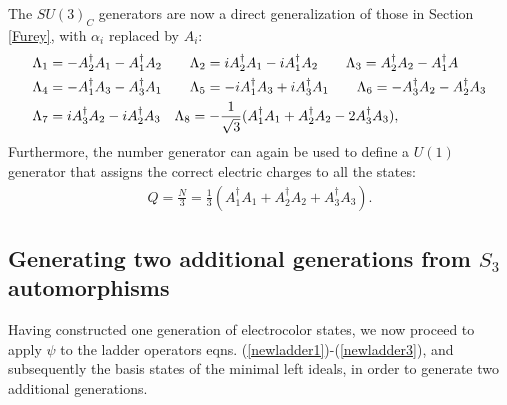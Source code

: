 \documentclass{article}
\newcommand{\bb}[1]{\mathbb{#1}}
\begin{document}
The $SU(3)_C$ generators are now a direct generalization of those in Section \ref{Furey}, with $\alpha_i$ replaced by $A_i$:
\begin{align} \notag
     \Lambda_1 &= -A_2^\dagger A_1 - A_1^\dagger A_2 \notag \hspace{2em}
     \Lambda_2 = iA_2^\dagger A_1 -iA_1^\dagger A_2 \notag \hspace{2em}
     \Lambda_3 = A_2^\dagger A_2 - A_1^\dagger A \notag\\ 
     \Lambda_4 &= -A_1^\dagger A_3 - A_3^\dagger A_1 \notag \hspace{2em}
     \Lambda_5 = -iA_1^\dagger A_3 + iA_3^\dagger A_1 \notag \hspace{2em}
     \Lambda_6 = -A_3^\dagger A_2 - A_2^\dagger A_3 \notag\\
     \Lambda_7 &= iA_3^\dagger A_2 - iA_2^\dagger A_3 \notag \hspace{1em}
     \Lambda_8 = -\frac{1}{\sqrt{3}}(A_1^\dagger A_1 + A_2^\dagger A_2 - 2A_3^\dagger A_3), \notag
 \end{align}
Furthermore, the number generator can again be used to define a $U(1)$ generator that assigns the correct electric charges to all the states:
\begin{eqnarray}\label{chargeQ}
    Q=\frac{N}{3}=\frac{1}{3}(A_1^{\dagger}A_1+A_2^{\dagger}A_2+A_3^{\dagger}A_3).
\end{eqnarray}
 
\subsection{Generating two additional generations from $S_3$ automorphisms}

Having constructed one generation of electrocolor states, we now proceed to apply $\psi$ to the ladder operators eqns. (\ref{newladder1})-(\ref{newladder3}), and subsequently the basis states of the minimal left ideals, in order to generate two additional generations. 

\end{document}
